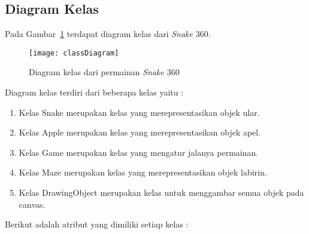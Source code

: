 \subsection{Diagram Kelas}
Pada Gambar~\ref{fig:classDiagram} terdapat diagram kelas dari \textit{Snake} 360.

\begin{figure}[H]
	\centering  
	\texttt{[image: classDiagram]}  
	\caption[Diagram class dari permainan \textit{Snake} 360]{Diagram kelas dari permainan \textit{Snake} 360}
	\label{fig:classDiagram} 
\end{figure}

Diagram kelas terdiri dari beberapa kelas yaitu :

\begin{enumerate}
	\item Kelas Snake merupakan  kelas yang merepresentasikan objek ular.
	\item Kelas Apple merupakan kelas yang merepresentasikan objek apel.
	\item Kelas Game merupakan kelas yang mengatur jalanya permainan.
	\item Kelas Maze merupakan kelas yang merepresentasikan objek labirin.
	\item Kelas DrawingObject merupakan kelas untuk menggambar semua objek pada canvas.
\end{enumerate}

Berikut adalah atribut yang dimiliki setiap kelas :

